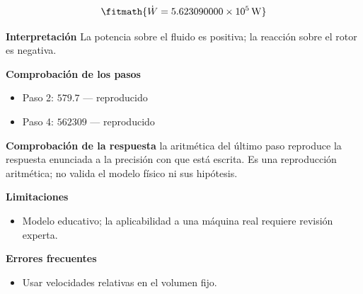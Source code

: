 \documentclass[10pt,openany]{book}
\begin{document}
\begin{tcolorbox}[title={Problema resuelto 1}, studiumworked, breakable]
\[
\fitmath{\dot{W}=5.623090000\times10^{5}\,\mathrm{W}}
\]

\noindent\textbf{Interpretación}
La potencia sobre el fluido es positiva; la reacción sobre el rotor es negativa.

\noindent\textbf{Comprobación de los pasos}
\begin{itemize}
\item Paso 2: $579.7$ — reproducido
\item Paso 4: $562309$ — reproducido
\end{itemize}

\noindent\textbf{Comprobación de la respuesta} la aritmética del último paso reproduce la respuesta enunciada a la precisión con que está escrita. Es una reproducción aritmética; no valida el modelo físico ni sus hipótesis.

\noindent\textbf{Limitaciones}
\begin{itemize}
\item Modelo educativo; la aplicabilidad a una máquina real requiere revisión experta.
\end{itemize}

\noindent\textbf{Errores frecuentes}
\begin{itemize}
\item Usar velocidades relativas en el volumen fijo.
\end{itemize}
\end{tcolorbox}
\end{document}
